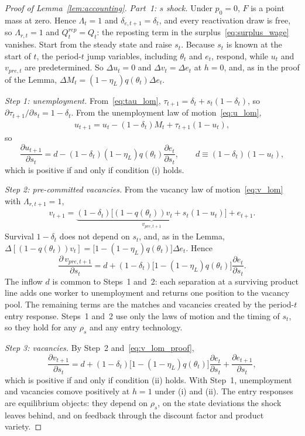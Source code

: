\documentclass[authoryear, review, 12pt]{elsarticle}
\begin{document}
\begin{proof}[Proof of Lemma~\ref{lem:accounting}]
\emph{Part~1: $s$ shock.}
Under $p_0=0$, $F$ is a point mass at zero. Hence $\Lambda_t=1$ and
$\delta_{e,t+1}=\delta_t$, and every reactivation draw is free, so
$\Lambda_{r,t}=1$ and $Q_t^{rep}=Q_t$: the reposting term in the
surplus~\eqref{eq:surplus_wage} vanishes. Start from the steady state
and raise $s_t$. Because $s_t$ is known at the start of $t$, the
period-$t$ jump variables, including $\theta_t$ and $e_t$, respond,
while $u_t$ and $v_{pre,t}$ are predetermined. So $\Delta u_t=0$ and
$\Delta v_t=\Delta e_t$ at $h=0$, and, as in the proof of the Lemma,
$\Delta M_t=(1-\eta_L)q(\theta_t)\Delta e_t$.

\medskip\noindent\emph{Step 1: unemployment.}
From~\eqref{eq:tau_lom}, $\tau_{t+1}=\delta_t+s_t(1-\delta_t)$, so
$\partial\tau_{t+1}/\partial s_t=1-\delta_t$. From the unemployment law
of motion~\eqref{eq:u_lom},
\begin{align}\label{eq:u_lom_proof}
	u_{t+1}
	= u_t-(1-\delta_t)M_t
	  + \tau_{t+1}(1-u_t),
\end{align}
so
\[
	\frac{\partial u_{t+1}}{\partial s_t}
	= d-(1-\delta_t)(1-\eta_L)q(\theta_t)\frac{\partial e_t}{\partial s_t},
	\qquad d\equiv(1-\delta_t)(1-u_t),
\]
which is positive if and only if condition (i) holds.

\medskip\noindent\emph{Step 2: pre-committed vacancies.}
From the vacancy law of motion~\eqref{eq:v_lom} with $\Lambda_{r,t+1}=1$,
\begin{align}\label{eq:v_lom_proof}
	v_{t+1}
	= \underbrace{(1-\delta_t)
		\bigl[(1-q(\theta_t))v_t
		+s_t(1-u_t)\bigr]}_{v_{pre,t+1}}
	+ e_{t+1}.
\end{align}
Survival $1-\delta_t$ does not depend on $s_t$, and, as in the Lemma,
$\Delta[(1-q(\theta_t))v_t]=\bigl[1-(1-\eta_L)q(\theta_t)\bigr]\Delta e_t$.
Hence
\[
	\frac{\partial\,v_{pre,t+1}}{\partial s_t}
	= d+(1-\delta_t)\bigl[1-(1-\eta_L)q(\theta_t)\bigr]
	\frac{\partial e_t}{\partial s_t}.
\]
The inflow $d$ is common to Steps~1 and~2: each separation at a
surviving product line adds one worker to unemployment and returns one
position to the vacancy pool. The remaining terms are the matches and
vacancies created by the period-$t$ entry response. Steps~1 and~2 use
only the laws of motion and the timing of $s_t$, so they hold for any
$\rho_s$ and any entry technology.

\medskip\noindent\emph{Step 3: vacancies.}
By Step~2 and~\eqref{eq:v_lom_proof},
\[
	\frac{\partial v_{t+1}}{\partial s_t}
	= d+(1-\delta_t)\bigl[1-(1-\eta_L)q(\theta_t)\bigr]
	\frac{\partial e_t}{\partial s_t}
	+\frac{\partial e_{t+1}}{\partial s_t},
\]
which is positive if and only if condition (ii) holds. With Step~1,
unemployment and vacancies comove positively at $h=1$ under (i) and
(ii). The entry responses are equilibrium objects: they depend on
$\rho_s$, on the state deviations the shock leaves behind, and on
feedback through the discount factor and product variety.


\end{proof}
\end{document}
